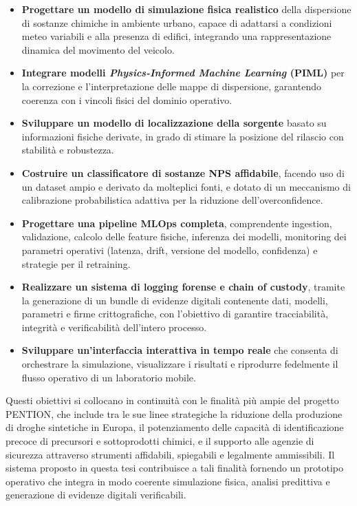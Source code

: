\begin{itemize}
	\item \textbf{Progettare un modello di simulazione fisica realistico} della dispersione di sostanze chimiche in ambiente urbano, capace di adattarsi a condizioni meteo variabili e alla presenza di edifici, integrando una rappresentazione dinamica del movimento del veicolo.
	\item \textbf{Integrare modelli \textit{Physics-Informed Machine Learning} (PIML)} per la correzione e l’interpretazione delle mappe di dispersione, garantendo coerenza con i vincoli fisici del dominio operativo.
	\item \textbf{Sviluppare un modello di localizzazione della sorgente} basato su informazioni fisiche derivate, in grado di stimare la posizione del rilascio con stabilità e robustezza.
	\item \textbf{Costruire un classificatore di sostanze NPS affidabile}, facendo uso di un dataset ampio e derivato da molteplici fonti, e dotato di un meccanismo di calibrazione probabilistica adattiva per la riduzione dell’overconfidence.
	\item \textbf{Progettare una pipeline MLOps completa}, comprendente ingestion, validazione, calcolo delle feature fisiche, inferenza dei modelli, monitoring dei parametri operativi (latenza, drift, versione del modello, confidenza) e strategie per il retraining.
	\item \textbf{Realizzare un sistema di logging forense e chain of custody}, tramite la generazione di un bundle di evidenze digitali contenente dati, modelli, parametri e firme crittografiche, con l'obiettivo di garantire tracciabilità, integrità e verificabilità dell'intero processo.
	\item \textbf{Sviluppare un'interfaccia interattiva in tempo reale} che consenta di orchestrare la simulazione, visualizzare i risultati e riprodurre fedelmente il flusso operativo di un laboratorio mobile.
\end{itemize}

Questi obiettivi si collocano in continuità con le finalità più ampie del progetto \textsc{PENTION}, che include tra le sue linee strategiche la riduzione della produzione di droghe sintetiche in Europa, il potenziamento delle capacità di identificazione precoce di precursori e sottoprodotti chimici, e il supporto alle agenzie di sicurezza attraverso strumenti affidabili, spiegabili e legalmente ammissibili. Il sistema proposto in questa tesi contribuisce a tali finalità fornendo un prototipo operativo che integra in modo coerente simulazione fisica, analisi predittiva e generazione di evidenze digitali verificabili.

